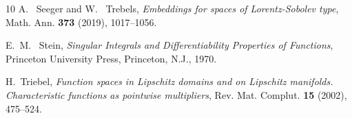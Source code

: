 \documentclass[reqno,centertags,11pt]{amsart}
\theoremstyle{definition}
\numberwithin{thm}{section}
\numberwithin{equation}{section}
\begin{document}
\begin{thebibliography}{10}
A. ~Seeger and  W. ~Trebels, \emph{Embeddings for spaces of Lorentz-Sobolev type}, Math. Ann. \textbf{373} (2019), 1017--1056.


E.~M. ~Stein, \emph{Singular {I}ntegrals and {D}ifferentiability {P}roperties of {F}unctions}, Princeton University Press, Princeton, N.J., 1970.


H.~Triebel, \emph{Function spaces in Lipschitz domains and on Lipschitz manifolds. Characteristic functions as pointwise multipliers}, Rev.  Mat.  Complut.  \textbf{15} (2002),  475--524.


\end{thebibliography}
\end{document}
